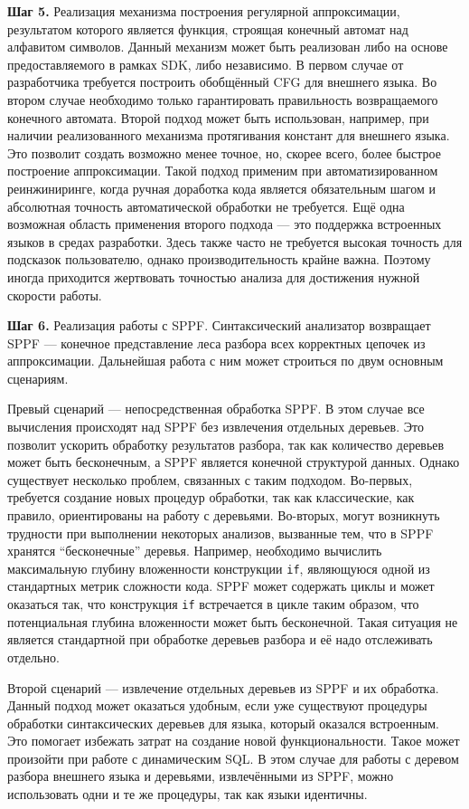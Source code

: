 \textbf{Шаг 5.} Реализация механизма построения регулярной аппроксимации, результатом которого является функция, строящая конечный автомат над алфавитом символов. Данный механизм может быть реализован либо на основе предоставляемого в рамках SDK, либо независимо. В первом случае от разработчика требуется построить обобщённый CFG для внешнего языка. Во втором случае необходимо только гарантировать правильность возвращаемого конечного автомата. Второй подход может быть использован, например, при наличии реализованного механизма протягивания констант для внешнего языка. Это позволит создать возможно менее точное, но, скорее всего, более быстрое построение аппроксимации. Такой подход применим при автоматизированном реинжиниринге, когда ручная доработка кода является обязательным шагом и абсолютная точность автоматической обработки не требуется. Ещё одна возможная область применения второго подхода --- это поддержка встроенных языков в средах разработки. Здесь также часто не требуется высокая точность для подсказок пользователю, однако производительность крайне важна. Поэтому иногда приходится жертвовать точностью анализа для достижения нужной скорости работы.

\textbf{Шаг 6.} Реализация работы с SPPF. Синтаксический анализатор возвращает SPPF --- конечное представление леса разбора всех корректных цепочек из аппроксимации. Дальнейшая работа с ним может строиться по двум основным сценариям.

Превый сценарий --- непосредственная обработка SPPF. В этом случае все вычисления происходят над SPPF без извлечения отдельных деревьев. Это позволит ускорить обработку результатов разбора, так как количество деревьев может быть бесконечным, а SPPF является конечной структурой данных. Однако существует несколько проблем, связанных с таким подходом. Во-первых, требуется создание новых процедур обработки, так как классические, как правило, ориентированы на работу с деревьями. Во-вторых, могут возникнуть трудности при выполнении некоторых анализов, вызванные тем, что в SPPF хранятся ``бесконечные'' деревья. Например, необходимо вычислить максимальную глубину вложенности конструкции \verb|if|, являющуюся одной из стандартных метрик сложности кода. SPPF может содержать 
циклы и может оказаться так, что конструкция \verb|if| встречается в цикле таким образом, что потенциальная глубина вложенности может быть бесконечной. Такая ситуация не является стандартной при 
обработке деревьев разбора и её надо отслеживать отдельно.

Второй сценарий --- извлечение отдельных деревьев из SPPF и их обработка. Данный подход может оказаться удобным, если уже существуют процедуры обработки синтаксических деревьев для языка, который оказался встроенным. Это помогает избежать затрат на создание новой функциональности. Такое может произойти при работе с динамическим SQL. В этом случае для работы с деревом разбора внешнего языка и деревьями, извлечёнными из SPPF, можно использовать одни и те же процедуры, так как языки идентичны.

